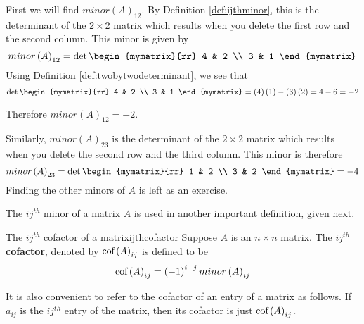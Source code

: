 \begin{solution} First we will find $minor\left( A\right) _{12}$. By Definition
\ref{def:ijthminor}, this is the determinant of the $2\times 2$ matrix
which results when you delete the first row and the second column. This
minor is given by
\begin{equation*}
minor \left(A\right)_{12}
=
\det \begin{mymatrix}{rr}
4 & 2 \\
3 & 1
\end{mymatrix}
\end{equation*}
Using Definition \ref{def:twobytwodeterminant}, we see that 
\begin{equation*}
\det \begin{mymatrix}{rr}
4 & 2 \\
3 & 1
\end{mymatrix} = \left(4\right)\left(1\right) - \left(3\right)\left(2\right) = 4 - 6 = -2
\end{equation*}

Therefore $minor \left(A\right)_{12} = -2$. 

Similarly, $minor\left(A\right)_{23}$ is the determinant of the $2\times 2$ matrix
which results when you delete the second row and the third column. This
minor is therefore
\begin{equation*}
minor \left(A\right)_{23} 
=
\det \begin{mymatrix}{rr}
1 & 2 \\
3 & 2
\end{mymatrix} = -4
\end{equation*}
Finding the other minors of $A$ is left as an exercise. 
\end{solution}

The $ij^{th}$ minor of a matrix $A$ is used in another important definition, given next.

\begin{definition}{The $ij^{th}$ cofactor of a matrix}{ijthcofactor}
Suppose $A$ is an $n\times n$ matrix. The $ij^{th}$ \textbf{cofactor}, denoted by $\mbox{cof}\left( A\right) _{ij}$ is
defined to be 
\begin{equation*}
\mbox{cof}\left( A\right) _{ij} = \left( -1\right) ^{i+j} minor\left(A\right)_{ij} 
\end{equation*}
\end{definition}

It is also convenient to refer to the
cofactor of an entry of a matrix as follows. If $a_{ij}$ is the $ij^{th}$ entry of the
matrix, then its cofactor is just $\mbox{cof}\left( A\right) _{ij}.$

